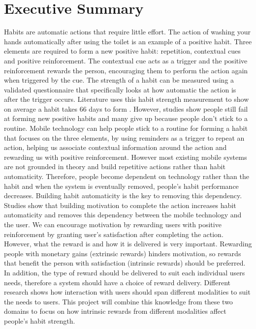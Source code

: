 \section*{Executive Summary}
Habits are automatic actions that require little effort. The action of washing your hands automatically after using the toilet is an example of a positive habit. Three elements are required to form a new positive habit: repetition, contextual cues and positive reinforcement. The contextual cue acts as a trigger and the positive reinforcement rewards the person, encouraging them to perform the action again when triggered by the cue. The strength of a habit can be measured using a validated questionnaire that specifically looks at how automatic the action is after the trigger occurs. Literature uses this habit strength measurement to show on average a habit takes 66 days to form \cite{article_how_habits_formed_modelling_habit_formation}. However, studies \cite{article_promoting_habit_formation, article_the_habitual_consumer} show people still fail at forming new positive habits and many give up because people don't stick to a routine.\newline
\newline
Mobile technology can help people stick to a routine for forming a habit that focuses on the three elements, by using reminders as a trigger to repeat an action, helping us associate contextual information around the action and rewarding us with positive reinforcement. However most existing mobile systems are not grounded in theory and build repetitive actions rather than habit automaticity. Therefore, people become dependent on technology rather than the habit and when the system is eventually removed, people's habit performance decreases.\newline
\newline
Building habit automaticity is the key to removing this dependency. Studies \cite{article_a_self_efficacy, article_meta_analytic_review_intrinsic_motivation} show that building motivation to complete the action increases habit automaticity and removes this dependency between the mobile technology and the user. We can encourage motivation by rewarding users with positive reinforcement by granting user's satisfaction after completing the action. However, what the reward is and how it is delivered is very important. Rewarding people with monetary gains (extrinsic rewards) hinders motivation, so rewards that benefit the person with satisfaction (intrinsic rewards) should be preferred. In addition, the type of reward should be delivered to suit each individual users needs, therefore a system should have a choice of reward delivery. Different research \cite{article_user_centred_multimodal_reminders} shows how interaction with users should span different modalities to suit the needs to users. This project will combine this knowledge from these two domains to focus on how intrinsic rewards from different modalities affect people's habit strength.\newline
